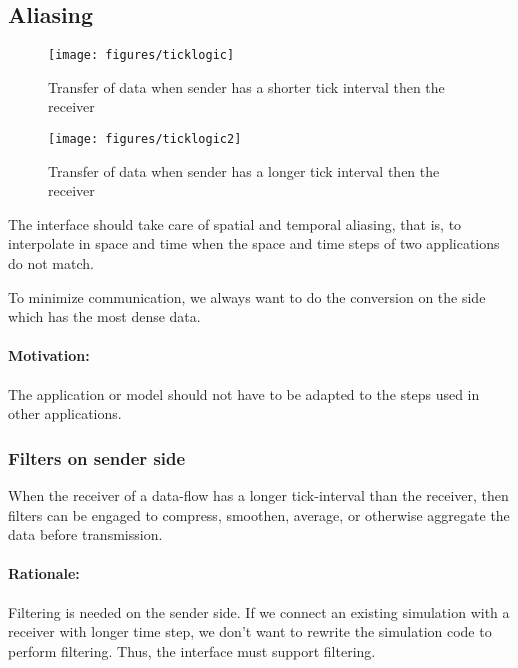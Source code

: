\documentclass[a4paper]{report}
\newenvironment{rationale}%
{\par\paragraph{Rationale:}}%
{\par}
\begin{document}
\subsection{Aliasing}

\begin{figure}
  \begin{center}
    \begin{minipage}{0.45\textwidth}
      \texttt{[image: figures/ticklogic]}
      \caption{Transfer of data when sender has a shorter
        tick interval then the receiver}
    \end{minipage}
    \hfill
    \begin{minipage}{0.45\textwidth}
      \texttt{[image: figures/ticklogic2]}
      \caption{Transfer of data when sender has a longer
        tick interval then the receiver}
    \end{minipage}
  \end{center}
\end{figure}

The interface should take care of spatial and temporal aliasing, that
is, to interpolate in space and time when the space and time steps of
two applications do not match.

To minimize communication, we always want to do the conversion on the
side which has the most dense data.

\paragraph{Motivation:} The application or model should not have to be
adapted to the steps used in other applications.


\subsubsection{Filters on sender side}

When the receiver of a data-flow has a longer tick-interval than the
receiver, then filters can be engaged to compress, smoothen, average,
or otherwise aggregate the data before transmission.

\begin{rationale}
  Filtering is needed on the sender side.  If we connect an existing
  simulation with a receiver with longer time step, we don't want to
  rewrite the simulation code to perform filtering.  Thus, the
  interface must support filtering.
\end{rationale}
\end{document}
